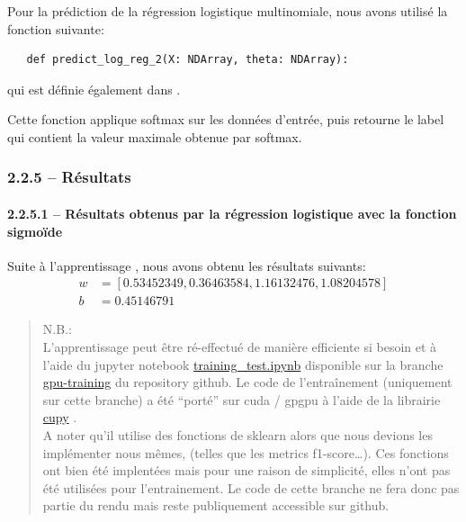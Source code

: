 \documentclass[
]{article}
\begin{document}
Pour la prédiction de la régression logistique multinomiale, nous avons
utilisé la fonction suivante:

\begin{lstlisting}
   def predict_log_reg_2(X: NDArray, theta: NDArray):
\end{lstlisting}

qui est définie également dans .

Cette fonction applique softmax sur les données d'entrée, puis retourne
le label qui contient la valeur maximale obtenue par softmax.

\newpage{}

\subsubsection{2.2.5 -- Résultats}\label{ruxe9sultats}

\paragraph{2.2.5.1 -- Résultats obtenus par la régression logistique
avec la fonction
sigmoïde}\label{ruxe9sultats-obtenus-par-la-ruxe9gression-logistique-avec-la-fonction-sigmouxefde}

Suite à l'apprentissage , nous avons obtenu les résultats suivants:
\begin{align*}
    w &= [0.53452349, 0.36463584, 1.16132476, 1.08204578]\\
    b &= 0.45146791
\end{align*}

\begin{quote}
N.B.:\\
L'apprentissage peut être ré-effectué de manière efficiente si besoin et
à l'aide du jupyter notebook
\href{https://github.com/David-Kyrat/13X005-AI-Project/blob/gpu-training/training_test.ipynb}{training\_test.ipynb}
disponible sur la branche
\href{https://github.com/David-Kyrat/13X005-AI-Project/blob/gpu-training/training_test.ipynb}{gpu-training}
du repository github. Le code de l'entraînement (uniquement sur cette
branche) a été ``porté'' sur cuda / gpgpu à l'aide de la librairie
\href{https://cupy.dev}{cupy} \cite{NumPySciPyGPU}.\\
A noter qu'il utilise des fonctions de sklearn alors que nous devions
les implémenter nous mêmes, (telles que les metrics f1-score\ldots). Ces
fonctions ont bien été implentées mais pour une raison de simplicité,
elles n'ont pas été utilisées pour l'entrainement. Le code de cette
branche ne fera donc pas partie du rendu mais reste publiquement
accessible sur github.
\end{quote}
\end{document}
